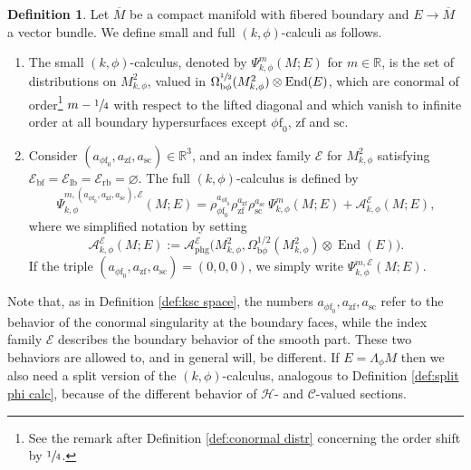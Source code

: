 \documentclass[JEP,XML,SOM,Unicode,NoFloatCountersInSection,published]{cedram}
\newcommand{\bphi}{{\bb\phi}}
\theoremstyle{plain}
\theoremstyle{definition}
\newtheorem{defn}[Th]{Definition}
\newcommand{\R}{{\mathbb{R}}}
\newcommand\calA{{\mathcal A}}
\newcommand\calE{{\mathcal E}}
\newcommand {\phg}{{\mathrm{phg}}}
\newcommand{\phif}{{\phi\mathrm{f}}}
\newcommand{\lf}{{\mathrm{lb}}}
\newcommand{\rf}{{\mathrm{rb}}}
\newcommand{\bb}{{\mathrm{b}}}
\newcommand{\bbf}{{\mathrm{bf}}}
\newcommand{\ssc}{{\mathrm{sc}}}
\newcommand{\zf}{{\mathrm{zf}}}
\DeclareMathOperator{\End}{End}
\newcommand{\Mbar}{{\overline{M}}}\let\M\Mbar
\begin{document}
\begin{defn}\label{def:psi k phi}
Let $\Mbar$ be a compact manifold with fibered boundary and $E\to\Mbar$ a vector bundle.
We define small and full $(k,\phi)$-calculi as follows.

\begin{enumerate}
\item
The small $(k,\phi)$-calculus, denoted by $\Psi_{k,\phi}^m(M;E)$
for $m\in\R$, is the set of distributions on $M^2_{k,\phi}$, valued in
$\Omega^{\sfrac12}_{\bphi}(M^{2}_{k, \phi}) \otimes \End(E)$,
which are conormal of order\footnote{See the remark after Definition \ref{def:conormal distr} concerning the order shift by $\sfrac14$.}
$m-\sfrac14$ with respect to the lifted diagonal
and which vanish to infinite order at all boundary hypersurfaces except $\phif_0$, $\zf$ and $\ssc$.

\item
Consider $(a_{\phif_0},a_{\zf},a_{\ssc}) \in \mathbb{R}^{3}$,
and an index family $\mathcal{E}$ for $M^{2}_{k, \phi}$ satisfying
$ \calE_{\bbf}=\calE_{\lf}=\calE_{\rf}=\varnothing$. The full $(k,\phi)$-calculus is defined by
\begin{equation}
\Psi_{k,\phi}^{m,(a_{\phif_0}, a_\zf,a_\ssc),\calE}(M;E) =
\rho_{\phif_0}^{a_{\phif_0}}\rho_\zf^{a_\zf}\rho_\ssc^{a_\ssc}\,\Psi_{k,\phi}^m(M;E) + \calA^{\calE}_{k,\phi}(M;E),
\end{equation}
where we simplified notation by setting
\begin{equation*}
\calA^{\calE}_{k,\phi}(M;E):= \calA_{\phg}^\calE \bigl(M^{2}_{k, \phi},
\Omega^{1/2}_{\bphi} (M^{2}_{k, \phi})
\otimes \End(E)\bigr).
\end{equation*}
If the triple $(a_{\phif_0}, a_\zf,a_\ssc) = (0,0,0)$, we simply write $\Psi_{k,\phi}^{m,\calE}(M;E)$.
\end{enumerate}
\end{defn}

Note that, as in Definition \ref{def:ksc space}, the numbers $a_{\phif_0}, a_\zf,a_\ssc$ refer to the behavior of the
conormal singularity at the boundary faces, while the index family $\calE$ describes the boundary behavior
of the smooth part. These two behaviors are allowed to, and in general will, be different.
If $E=\Lambda_\phi M$ then
we also need a split version of the $(k,\phi)$-calculus, analogous to Definition \ref{def:split phi calc},
because of the different behavior of $\mathscr{H}$\nobreakdash- and $\mathscr{C}$-valued sections.
\end{document}
